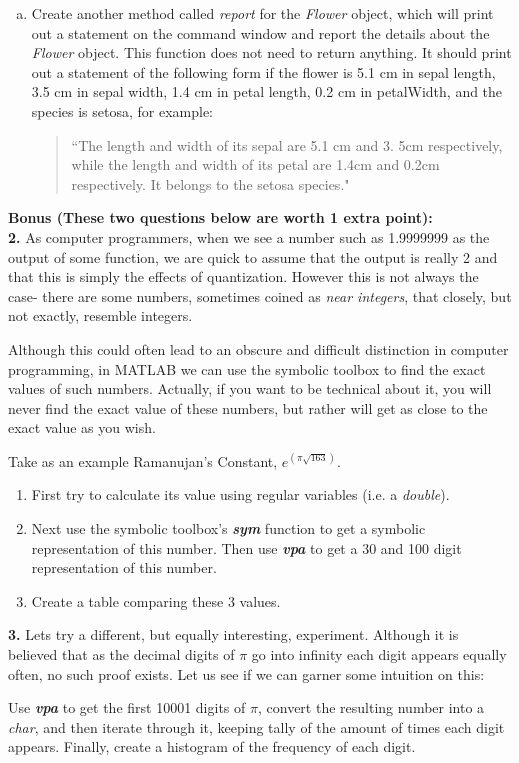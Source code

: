\documentclass[11pt]{article}
\begin{document}
\begin{enumerate}[a.]
	\item Create another method called \textit{report} for the \textit{Flower} object,
	which will print out a statement on the command window and report
	the details about the \textit{Flower} object.
	This function does not need to return anything.
	It should print out a statement of the following form if the flower
	is 5.1 cm in sepal length, 3.5 cm in sepal width, 1.4 cm in petal length,
	0.2 cm in petalWidth, and the species is setosa, for example:
	\begin{quote}
		``The length and width of its sepal are 5.1 cm and 3. 5cm respectively,
		while the length and width of its petal are 1.4cm and 0.2cm respectively.
		It belongs to the setosa species."
	\end{quote}

	\end{enumerate}


	\noindent
	\newline
	\textbf{Bonus (These two questions below are worth 1 extra point):}\\

	\textbf{2.} As computer	programmers, when we see a number such as 1.9999999 as the output of
	some function, we are quick to assume that the output is really 2 and that this is
	simply the effects of quantization. However this is not always the case- there are
	some numbers, sometimes coined as \textit{near integers}, that closely, but not exactly,
	resemble integers.

	Although this could often lead to an obscure and difficult distinction in computer programming, 
	in MATLAB we can use the symbolic toolbox to find the exact values of such numbers.
	Actually, if you want to be technical about it, you will never find the exact value of these numbers, but
	rather will get as close to the exact value as you wish.

	Take as an example Ramanujan's Constant, $e^{(\pi\sqrt{163})}$.
	
	\begin{enumerate}[a]
		\item First try to calculate its value using regular variables (i.e. a \textit{double}).
	
		\item Next use the symbolic toolbox's \textit{\textbf{sym}} function to get a symbolic 
		representation of this number. Then use \textit{\textbf{vpa}} to get a 30 and 100 digit
		representation of this number.
		
		\item Create a table comparing these 3 values. 
	\end{enumerate}

	\textbf{3.} Lets try a different, but equally interesting, experiment. Although it is believed
	that as the decimal digits of $\pi$ go into infinity each digit appears equally often, 
	no such proof exists. Let us see if we can garner some intuition on this:

	Use \textit{\textbf{vpa}} to get the first 10001 digits of $\pi$, convert the resulting number
	into a \textit{char}, and then iterate through it, keeping tally of the amount of times each digit
	appears. Finally, create a histogram of the frequency of each digit.
\end{document}
